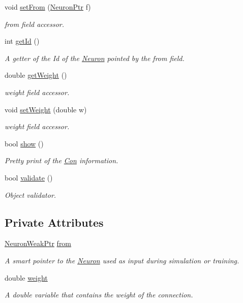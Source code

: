 \begin{DoxyCompactItemize}
void \hyperlink{class_con_a40b0ebc859b40eb908ee937abf6886c5}{setFrom} (\hyperlink{_a_m_o_r_e_8h_ac1ea936c2c7728eb382278131652fef4}{NeuronPtr} f)
\begin{DoxyCompactList}\small\item\em from field accessor. \end{DoxyCompactList}\item 
int \hyperlink{class_con_ad12ce81a557eadb2a00b10d5b5f4adb6}{getId} ()
\begin{DoxyCompactList}\small\item\em A getter of the Id of the \hyperlink{class_neuron}{Neuron} pointed by the from field. \end{DoxyCompactList}\item 
double \hyperlink{class_con_a385c5bf6eb9e2ffc94c5b427c287ccb2}{getWeight} ()
\begin{DoxyCompactList}\small\item\em weight field accessor. \end{DoxyCompactList}\item 
void \hyperlink{class_con_aa9b30bb7eda5c5578d11a65977968d38}{setWeight} (double w)
\begin{DoxyCompactList}\small\item\em weight field accessor. \end{DoxyCompactList}\item 
bool \hyperlink{class_con_ab85838575b5e01f3b8073136f2102922}{show} ()
\begin{DoxyCompactList}\small\item\em Pretty print of the \hyperlink{class_con}{Con} information. \end{DoxyCompactList}\item 
bool \hyperlink{class_con_af5f836a7b0988b3d9113589b2959d5e6}{validate} ()
\begin{DoxyCompactList}\small\item\em Object validator. \end{DoxyCompactList}\end{DoxyCompactItemize}
\subsection*{Private Attributes}
\begin{DoxyCompactItemize}
\item 
\hyperlink{_a_m_o_r_e_8h_a3e2d414e247d33f77957e70765d161c0}{NeuronWeakPtr} \hyperlink{class_con_a7c05f90dff56fd26c1fa0f042bba67a6}{from}
\begin{DoxyCompactList}\small\item\em A smart pointer to the \hyperlink{class_neuron}{Neuron} used as input during simulation or training. \end{DoxyCompactList}\item 
double \hyperlink{class_con_a7f46485ba5b41971ea38641f9e7d1be0}{weight}
\begin{DoxyCompactList}\small\item\em A double variable that contains the weight of the connection. \end{DoxyCompactList}\end{DoxyCompactItemize}


